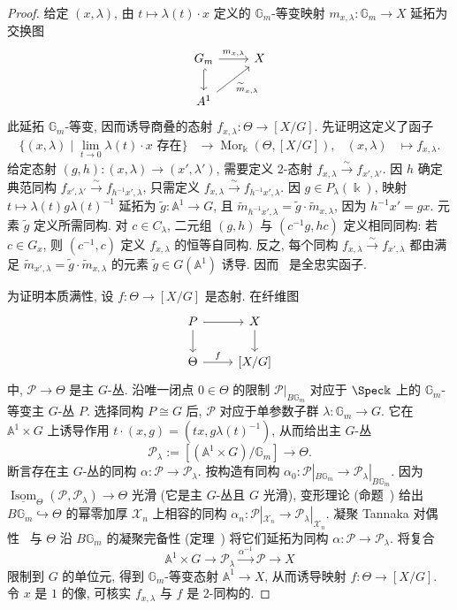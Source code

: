 \begin{proof}
给定 $(x,\lambda)$, 由 $t\mapsto\lambda(t)\cdot x$ 定义的 $\mathbb G_m$-等变映射 $m_{x,\lambda}:\mathbb G_m\to X$ 延拓为交换图
\[\begin{tikzcd}[ampersand replacement=\&]\mathbb G_m\arrow[r,"{m_{x,\lambda}}"]\arrow[d,hook]\&X\\\mathbb A^1\arrow[ur,"{\widetilde m_{x,\lambda}}"']\&\end{tikzcd}\]
此延拓 $\mathbb G_m$-等变, 因而诱导商叠的态射 $f_{x,\lambda}:\Theta\to[X/G]$. 先证明这定义了函子
\begin{align}\label{src:7.9.3}
\{(x,\lambda)\mid\lim_{t\to0}\lambda(t)\cdot x\text{ 存在}\}&\longrightarrow\operatorname{Mor}_{\Bbbk}(\Theta,[X/G]),& (x,\lambda)&\longmapsto f_{x,\lambda}.
\end{align}
给定态射 $(g,h):(x,\lambda)\to(x',\lambda')$, 需要定义 $2$-态射 $f_{x,\lambda}\xrightarrow{\sim}f_{x',\lambda'}$. 因 $h$ 确定典范同构 $f_{x',\lambda'}\xrightarrow{\sim}f_{h^{-1}x',\lambda}$, 只需定义 $f_{x,\lambda}\xrightarrow{\sim}f_{h^{-1}x',\lambda}$. 因 $g\in P_\lambda(\Bbbk)$, 映射 $t\mapsto\lambda(t)g\lambda(t)^{-1}$ 延拓为 $\widetilde g:\mathbb A^1\to G$, 且 $\widetilde m_{h^{-1}x',\lambda}=\widetilde g\cdot\widetilde m_{x,\lambda}$, 因为 $h^{-1}x'=gx$. 元素 $\widetilde g$ 定义所需同构. 对 $c\in C_\lambda$, 二元组 $(g,h)$ 与 $(c^{-1}g,hc)$ 定义相同同构: 若 $c\in G_x$, 则 $(c^{-1},c)$ 定义 $f_{x,\lambda}$ 的恒等自同构. 反之, 每个同构 $f_{x,\lambda}\xrightarrow{\sim}f_{x',\lambda}$ 都由满足 $\widetilde m_{x',\lambda}=\widetilde g\cdot\widetilde m_{x,\lambda}$ 的元素 $\widetilde g\in G(\mathbb A^1)$ 诱导. 因而~ 是全忠实函子.

为证明本质满性, 设 $f:\Theta\to[X/G]$ 是态射. 在纤维图
\[\begin{tikzcd}[ampersand replacement=\&]\mathcal P\arrow[r]\arrow[d]\&X\arrow[d]\\\Theta\arrow[r,"{f}"]\&{[X/G]}\end{tikzcd}\]
中, $\mathcal P\to\Theta$ 是主 $G$-丛. 沿唯一闭点 $0\in\Theta$ 的限制 $\mathcal P|_{B\mathbb G_m}$ 对应于 $\Spec\Bbbk$ 上的 $\mathbb G_m$-等变主 $G$-丛 $P$. 选择同构 $P\cong G$ 后, $\mathcal P$ 对应于单参数子群 $\lambda:\mathbb G_m\to G$. 它在 $\mathbb A^1\times G$ 上诱导作用 $t\cdot(x,g)=(tx,g\lambda(t)^{-1})$, 从而给出主 $G$-丛
\[\mathcal P_\lambda:=[(\mathbb A^1\times G)/\mathbb G_m]\to\Theta.\]
断言存在主 $G$-丛的同构 $\alpha:\mathcal P\to\mathcal P_\lambda$. 按构造有同构 $\alpha_0:\mathcal P|_{B\mathbb G_m}\to\mathcal P_\lambda|_{B\mathbb G_m}$. 因为 $\underline{\operatorname{Isom}}_\Theta(\mathcal P,\mathcal P_\lambda)\to\Theta$ 光滑 (它是主 $G$-丛且 $G$ 光滑), 变形理论 (命题~) 给出 $B\mathbb G_m\hookrightarrow\Theta$ 的幂零加厚 $\mathcal X_n$ 上相容的同构 $\alpha_n:\mathcal P|_{\mathcal X_n}\to\mathcal P_\lambda|_{\mathcal X_n}$. 凝聚 Tannaka 对偶性~ 与 $\Theta$ 沿 $B\mathbb G_m$ 的凝聚完备性 (定理~) 将它们延拓为同构 $\alpha:\mathcal P\to\mathcal P_\lambda$. 将复合
\[\mathbb A^1\times G\to\mathcal P_\lambda\xrightarrow{\alpha^{-1}}\mathcal P\to X\]
限制到 $G$ 的单位元, 得到 $\mathbb G_m$-等变态射 $\mathbb A^1\to X$, 从而诱导映射 $f:\Theta\to[X/G]$. 令 $x$ 是 $1$ 的像, 可核实 $f_{x,\lambda}$ 与 $f$ 是 $2$-同构的.
\end{proof}
